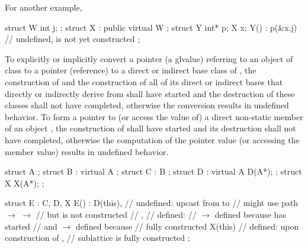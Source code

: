 \pnum
For another example,

\begin{codeblock}
struct W { int j; };
struct X : public virtual W { };
struct Y {
  int* p;
  X x;
  Y() : p(&x.j) {   // undefined,  is not yet constructed
    }
};
\end{codeblock}
\exitexample

\pnum
{}%
%
To explicitly or implicitly convert a pointer (a glvalue) referring to
an object of class
to a pointer (reference) to a direct or indirect base class
of
,
the construction of
and the construction of all of its direct or indirect bases that directly or
indirectly derive from
shall have started and the destruction of these classes shall not have
completed, otherwise the conversion results in undefined behavior.
To form a pointer to (or access the value of) a direct non-static member of
an object
,
the construction of
shall have started and its destruction shall not have completed,
otherwise the computation of the pointer value (or accessing the member
value) results in undefined behavior.
\enterexample

\begin{codeblock}
struct A { };
struct B : virtual A { };
struct C : B { };
struct D : virtual A { D(A*); };
struct X { X(A*); };

struct E : C, D, X {
  E() : D(this),    // undefined: upcast from  to 
                    // might use path  $\rightarrow$  $\rightarrow$ 
                    // but  is not constructed
                    // , // defined:
                    //  $\rightarrow$  defined because  has started
                    // and  $\rightarrow$  defined because
                    //  fully constructed
  X(this) {         // defined: upon construction of ,
                    //  sublattice is fully constructed
  }
};
\end{codeblock}
\exitexample


